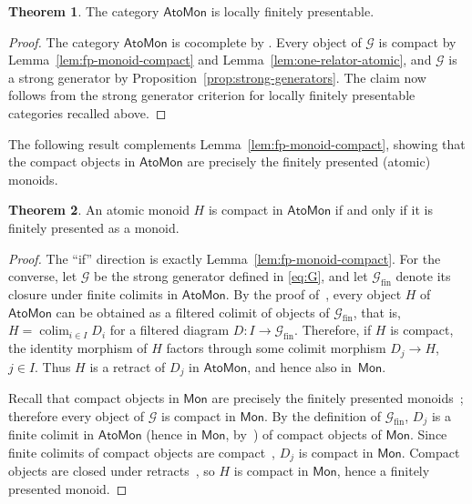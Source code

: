 \documentclass[a4paper,10pt,reqno]{amsart}
\theoremstyle{definition}
\newtheorem{theorem}{Theorem}[section]
\theoremstyle{remark}
\newcommand{\AtoMon}{\mathsf{AtoMon}}
\newcommand{\Mon}{\mathsf{Mon}}
\begin{document}
\begin{theorem}\label{thm:lfp}
The category $\AtoMon$ is locally finitely presentable.
\end{theorem}

\begin{proof}
The category $\AtoMon$ is cocomplete by \cite[Theorem~6.3]{CCT}.
Every object of $\mathcal G$ is compact by
Lemma~\ref{lem:fp-monoid-compact} and
Lemma~\ref{lem:one-relator-atomic}, and $\mathcal G$ is a strong generator by Proposition~\ref{prop:strong-generators}.  The claim now follows from the strong generator criterion for locally finitely presentable categories recalled above.
\end{proof}

The following result complements Lemma~\ref{lem:fp-monoid-compact}, showing that the compact objects in $\AtoMon$ are precisely the finitely presented (atomic) monoids.

\begin{theorem}\label{thm:compact-characterization}
An atomic monoid $H$ is compact in $\AtoMon$ if and only if it is finitely presented as a monoid.
\end{theorem}

\begin{proof}
The ``if'' direction is exactly Lemma~\ref{lem:fp-monoid-compact}.
For the converse, let $\mathcal G$ be the strong generator defined in \eqref{eq:G}, and let $\mathcal G_{\mathrm{fin}}$ denote its closure under finite colimits in $\AtoMon$.  By the proof of~\cite[Theorem~1.11]{AR}, every object $H$ of $\AtoMon$ can be obtained as a filtered colimit of objects of $\mathcal G_{\mathrm{fin}}$, that is, $H=\mathop{\mathrm{colim}}_{i\in I}D_i$ for a filtered diagram $D\colon I \to \mathcal{G}_\mathrm{fin}$.
Therefore, if $H$ is compact, the identity morphism of $H$ factors through some colimit morphism $D_j \to H$, $j \in I$.  Thus $H$ is a retract of $D_j$ in $\AtoMon$, and hence also in~$\Mon$.

Recall that compact objects in $\Mon$ are precisely the finitely presented monoids~\cite[Example~1.2(5)]{AR}; therefore every object of $\mathcal G$ is compact in $\Mon$. By the definition of $\mathcal G_\mathrm{fin}$, $D_j$ is a finite colimit in $\AtoMon$ (hence in $\Mon$, by~\cite[Theorem~6.3]{CCT}) of compact objects of $\Mon$. Since finite colimits of compact objects are compact~\cite[Proposition~1.3]{AR}, $D_j$ is compact in $\Mon$. Compact objects are closed under retracts~\cite[Remark,~p.13]{AR}, so $H$ is compact in $\Mon$, hence a finitely presented monoid.
\end{proof}
\end{document}
